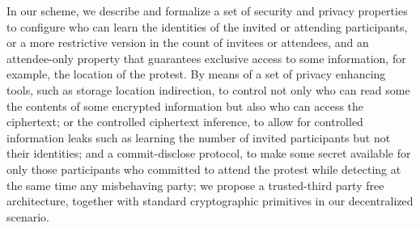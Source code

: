 In our scheme, we describe and formalize a set of security and privacy properties 
to configure who can learn the identities of the invited or attending participants, 
or a more restrictive version in the count of invitees or attendees, and an attendee-only 
property that guarantees exclusive access to some information, for example, the 
location of the protest. By means of a set of privacy enhancing tools, such as storage 
location indirection, to control not only who can read some the contents of some 
encrypted information but also who can access the ciphertext; or the controlled 
ciphertext inference, to allow for controlled information leaks such as learning 
the number of invited participants but not their identities; and a commit-disclose 
protocol, to make some secret available for only those participants who committed 
to attend the protest while detecting at the same time any misbehaving party; we 
propose a trusted-third party free architecture, together with standard cryptographic 
primitives in our decentralized scenario.


